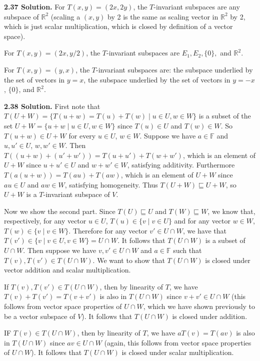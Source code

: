 \textbf{2.37 Solution.} For $T(x,y) = (2x,2y)$, the $T$-invariant subspaces are any subspace of $\mathbb{R}^2$ (scaling a $(x,y)$ by 2 is the same as scaling vector in $\mathbb{R}^2$ by 2, which is just scalar multiplication, which is closed by definition of a vector space).

For $T(x,y) = (2x,y/2)$, the $T$-invariant subspaces are $E_1,E_2,\{0\},$ and $\mathbb{R}^2$.

For $T(x,y) = (y,x)$, the $T$-invariant subspaces are: the subspace underlied by the set of vectors in $y=x$, the subspace underlied by the set of vectors in $y=-x$, $\{0\}$, and $\mathbb{R}^2$.

\textbf{2.38 Solution.} First note that $T(U+W) = \{T(u+w) = T(u) + T(w) \mid u \in U, w \in W\}$ is a subset of the set $U+W = \{u + w \mid u \in U, w \in W\}$ since $T(u) \in U$ and $T(w) \in W$. So $T(u+w) \in U + W$ for every $u \in U$, $w \in W$. Suppose we have $a \in \mathbb{F}$ and $u,u' \in U$, $w,w' \in W$. Then $T((u+w) + (u'+w')) = T(u+u') + T(w+w')$, which is an element of $U+W$ since $u+u' \in U$ and $w+w' \in W$, satisfying additivity. Furthermore $T(a(u+w)) = T(au) + T(aw)$, which is an element of $U+W$ since $au \in U$ and $aw \in W$, satisfying homogeneity. Thus $T(U+W) \sqsubseteq U+W$, so $U+W$ is a $T$-invariant subspace of $V$.

Now we show the second part. Since $T(U) \sqsubseteq U$ and $T(W) \sqsubseteq W$, we know that, respectively, for any vector $u \in U$, $T(u) \in \{v \mid v \in U\}$ and for any vector $w \in W$, $T(w) \in \{v \mid v \in W\}$. Therefore for any vector $v' \in U \cap W$, we have that $T(v') \in \{v \mid v \in U, v \in W\} = U \cap W$. It follows that $T(U \cap W)$ is a subset of $U \cap W$. Then suppose we have $v,v' \in U \cap W$ and $a \in \mathbb{F}$ such that $T(v),T(v') \in T(U \cap W)$. We want to show that $T(U \cap W)$ is closed under vector addition and scalar multiplication.

If $T(v), T(v') \in T(U \cap W)$, then by linearity of $T$, we have $T(v) + T(v') = T(v + v')$ is also in $T(U \cap W)$ since $v+v' \in U \cap W$ (this follows from vector space properties of $U \cap W$, which we have shown previously to be a vector subspace of $V$). It follows that $T(U \cap W)$ is closed under addition.

IF $T(v) \in T(U \cap W)$, then by linearity of $T$, we have $aT(v) = T(av)$ is also in $T(U \cap W)$ since $av \in U \cap W$ (again, this follows from vector space properties of $U \cap W$). It follows that $T(U \cap W)$ is closed under scalar multiplication.

